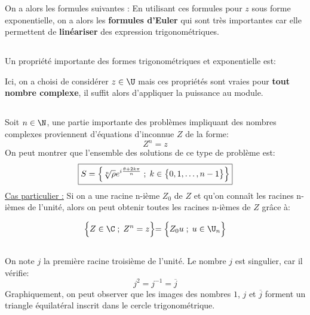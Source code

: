 On a alors les formules suivantes {:}
En utilisant ces formules pour \(z\) sous forme exponentielle, on a alors les \textbf{formules d'Euler} qui sont très importantes car elle permettent de \textbf{linéariser} des expression trigonométriques.\<

\subsection*{}
Un propriété importante des formes trigonométriques et exponentielle est:

Ici, on a choisi de considérer \(z \in \U\) mais ces propriétés sont vraies pour \textbf{tout nombre complexe}, il suffit alors d'appliquer la puissance au module.
\subsection*{}
Soit \(n \in \N\), une partie importante des problèmes impliquant des nombres complexes proviennent d'équations d'inconnue \(Z\) de la forme:
\[
   Z^n = z
\]
On peut montrer que l'ensemble des solutions de ce type de problème est:
\[
   \boxed{
      S = \Bigl\{ \sqrt[n]{\rho}e^{i\frac{\theta + 2k\pi}{n}}\; ; \; k \in \bigl\{0, 1, \ldots , n-1 \bigl\} \Bigl\}   
   }
\]
\underline{Cas particulier {:}}
Si on a une racine n-ième \(Z_0\) de \(Z\) et qu'on connaît les racines n-ièmes de l'unité, alors on peut obtenir toutes les racines n-ièmes de \(Z\) grâce à:

\[
   \Bigl\{ Z \in \C \; ; \; Z^n = z \Bigl\} = \Bigl\{ Z_0u \; ; \; u \in \U_n \Bigl\}   
\]
\subsection*{}
On note \(j\) la première racine troisième de l'unité.
Le nombre \(j\) est singulier, car il vérifie:
\[
    \boxed{
       j^2 = j^{-1} = \overline{j}
    }
\]
Graphiquement, on peut observer que les images des nombres \(1\), \(j\) et \(\overline{j}\) forment un triangle équilatéral inscrit dans le cercle trigonométrique.

